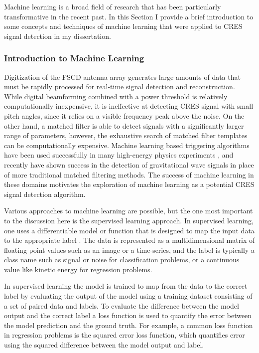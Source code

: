Machine learning is a broad field of research \cite{prml} that has been particularly transformative in the recent past. In this Section I provide a brief introduction to some concepts and techniques of machine learning that were applied to CRES signal detection in my dissertation.

\subsubsection*{Introduction to Machine Learning}
\label{sec:chap4-intro-ml}

Digitization of the FSCD antenna array generates large amounts of data that must be rapidly processed for real-time signal detection and reconstruction. While digital beamforming combined with a power threshold is relatively computationally inexpensive, it is ineffective at detecting CRES signal with small pitch angles, since it relies on a visible frequency peak above the noise. On the other hand, a matched filter is able to detect signals with a significantly larger range of parameters, however, the exhaustive search of matched filter templates can be computationally expensive. Machine learning based triggering algorithms have been used successfully in many high-energy physics experiments \cite{ml_lhc}, and recently have shown success in the detection of gravitational wave signals \cite{ml_ligo_1,ml_ligo_2} in place of more traditional matched filtering methods. The success of machine learning in these domains motivates the exploration of machine learning as a potential CRES signal detection algorithm. 

Various approaches to machine learning are possible, but the one most important to the discussion here is the supervised learning approach. In supervised learning, one uses a differentiable model or function that is designed to map the input data to the appropriate label \cite{prml}. The data is represented as a multidimensional matrix of floating point values such as an image or a time-series, and the label is typically a class name such as signal or noise for classification problems, or a continuous value like kinetic energy for regression problems. 

In supervised learning the model is trained to map from the data to the correct label by evaluating the output of the model using a training dataset consisting of a set of paired data and labels. To evaluate the difference between the model output and the correct label a loss function is used to quantify the error between the model prediction and the ground truth. For example, a common loss function in regression problems is the squared error loss function, which quantifies error using the squared difference between the model output and label. 

